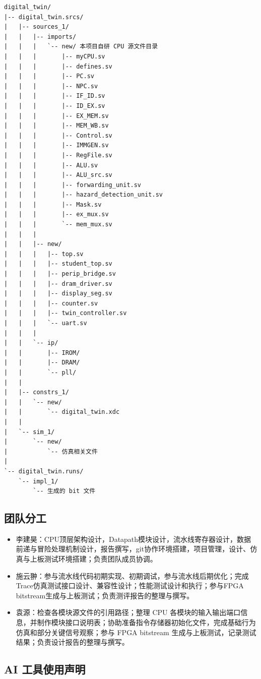 \documentclass[12pt,a4paper]{ctexart}
\begin{document}
\begin{verbatim}
digital_twin/
|-- digital_twin.srcs/
|   |-- sources_1/
|   |   |-- imports/
|   |   |   `-- new/ 本项目自研 CPU 源文件目录
|   |   |       |-- myCPU.sv
|   |   |       |-- defines.sv
|   |   |       |-- PC.sv
|   |   |       |-- NPC.sv
|   |   |       |-- IF_ID.sv
|   |   |       |-- ID_EX.sv
|   |   |       |-- EX_MEM.sv
|   |   |       |-- MEM_WB.sv
|   |   |       |-- Control.sv
|   |   |       |-- IMMGEN.sv
|   |   |       |-- RegFile.sv
|   |   |       |-- ALU.sv
|   |   |       |-- ALU_src.sv
|   |   |       |-- forwarding_unit.sv
|   |   |       |-- hazard_detection_unit.sv
|   |   |       |-- Mask.sv
|   |   |       |-- ex_mux.sv
|   |   |       `-- mem_mux.sv
|   |   |
|   |   |-- new/
|   |   |   |-- top.sv
|   |   |   |-- student_top.sv
|   |   |   |-- perip_bridge.sv
|   |   |   |-- dram_driver.sv
|   |   |   |-- display_seg.sv
|   |   |   |-- counter.sv
|   |   |   |-- twin_controller.sv
|   |   |   `-- uart.sv
|   |   |
|   |   `-- ip/
|   |       |-- IROM/
|   |       |-- DRAM/
|   |       `-- pll/
|   |
|   |-- constrs_1/
|   |   `-- new/
|   |       `-- digital_twin.xdc
|   |
|   `-- sim_1/
|       `-- new/
|           `-- 仿真相关文件
|
`-- digital_twin.runs/
    `-- impl_1/
        `-- 生成的 bit 文件
\end{verbatim}

\subsection{团队分工}

\begin{itemize}
	\item 李建昊：CPU顶层架构设计，Datapath模块设计，流水线寄存器设计，数据前递与冒险处理机制设计，报告撰写，git协作环境搭建，项目管理，设计、仿真与上板测试环境搭建；负责团队成员协调。
	\item 施云翀：参与流水线代码初期实现、初期调试，参与流水线后期优化；完成Trace仿真测试接口设计、兼容性设计；性能测试设计和执行；参与FPGA bitstream生成与上板测试；负责测评报告的整理与撰写。
	\item 袁源：检查各模块源文件的引用路径；整理 CPU 各模块的输入输出端口信息，并制作模块接口说明表；协助准备指令存储器初始化文件，完成基础行为仿真和部分关键信号观察；参与 FPGA bitstream 生成与上板测试，记录测试结果；负责设计报告的整理与撰写。
\end{itemize}

\subsection{AI 工具使用声明}
\end{document}
